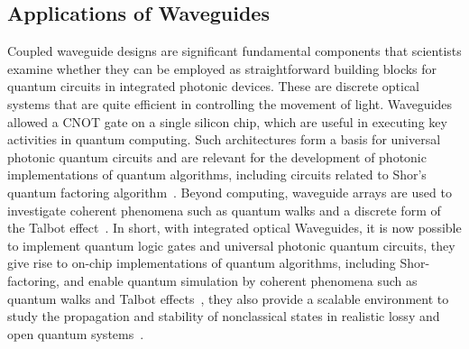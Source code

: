 \subsection{Applications of Waveguides}
Coupled waveguide designs are significant fundamental components that scientists examine whether they can be employed as straightforward building blocks for quantum circuits in integrated photonic devices\cite{Peruzzo2010}. These are discrete optical systems that are quite efficient in controlling the movement of light. Waveguides allowed a CNOT gate on a single silicon chip, which are useful in executing key activities in quantum computing. Such architectures form a basis for universal photonic quantum circuits and are relevant for the development of photonic implementations of quantum algorithms, including circuits related to Shor’s quantum factoring algorithm~\cite{Politi2008,OBrien2007,OBrien2009}. Beyond computing, waveguide arrays are used to investigate coherent phenomena such as quantum walks and a discrete form of the Talbot effect~\cite{Rai2010,Reck1994,Politi2008,Clements2016}.
In short, with integrated optical Waveguides, it is now possible to implement quantum logic gates and universal photonic quantum circuits, they give rise to on-chip implementations of quantum algorithms, including Shor-factoring, and enable quantum simulation by coherent phenomena such as quantum walks and Talbot effects~\cite{OBrien2007,OBrien2009,Politi2008,Peruzzo2010,Longhi2007}, they also provide a scalable environment to study the propagation and stability of nonclassical states in realistic lossy and open quantum systems~\cite{Reck1994,Politi2008,Clements2016,Rai2010}.

